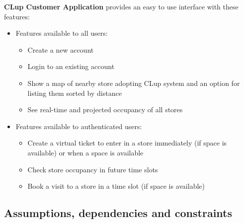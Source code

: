 \textbf{CLup Customer Application} provides an easy to use interface with these features:
\begin{itemize}
    \item Features available to all users:
          \begin{itemize}
              \item Create a new account
              \item Login to an existing account
              \item Show a map of nearby store adopting CLup system and an option for listing them sorted by distance
              \item See real-time and projected occupancy of all stores
          \end{itemize}
    \item Features available to authenticated users:
          \begin{itemize}
              \item Create a virtual ticket to enter in a store immediately (if space is available) or when a space is available
              \item Check store occupancy in future time slots
              \item Book a visit to a store in a time slot (if space is available)
          \end{itemize}
\end{itemize}

\subsection{Assumptions, dependencies and constraints}
